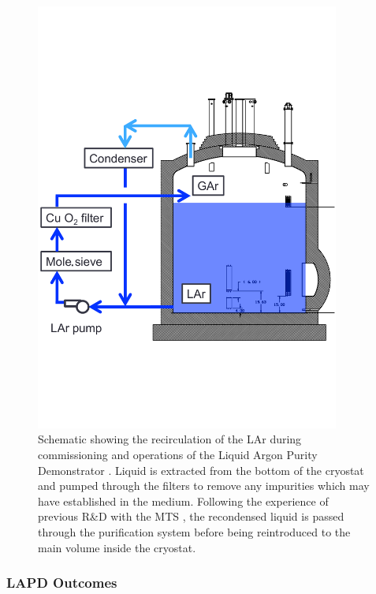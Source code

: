 \begin{figure}
  \centering
  \includegraphics[width=10cm]{LAPDLiquidCirculation.pdf}
  \caption[Schematic showing the recirculation of the LAr during commissioning and operations of the Liquid Argon Purity Demonstrator.]{Schematic showing the recirculation of the LAr during commissioning and operations of the Liquid Argon Purity Demonstrator \cite{LAPD2014}.  Liquid is extracted from the bottom of the cryostat and pumped through the filters to remove any impurities which may have established in the medium.  Following the experience of previous R\&D with the MTS \cite{MTS2009a}, the recondensed liquid is passed through the purification system before being reintroduced to the main volume inside the cryostat.}
  \label{fig:LAPDLiquidCirculation}
\end{figure}

\subsubsection{LAPD Outcomes}\label{sec:LAPDOutcomes}

